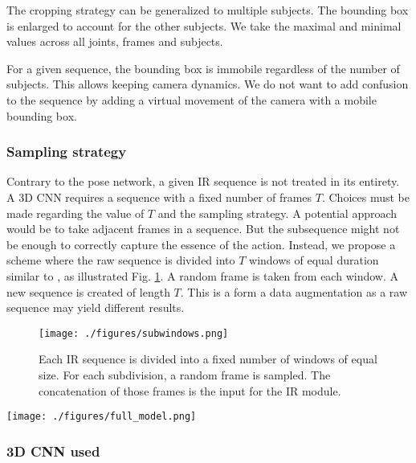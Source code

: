 \documentclass[letterpaper, 10 pt, conference]{ieeeconf}
\begin{document}
The cropping strategy can be generalized to multiple subjects. The bounding box is enlarged to account for the other subjects. We take the maximal and minimal values across all joints, frames and subjects.

For a given sequence, the bounding box is immobile regardless of the number of subjects. This allows keeping camera dynamics. We do not want to add confusion to the sequence by adding a virtual movement of the camera with a mobile bounding box. 

\subsubsection{Sampling strategy} \label{ir_sub_sample}

Contrary to the pose network, a given IR sequence is not treated in its entirety. A 3D CNN requires a sequence with a fixed number of frames $T$. Choices must be made regarding the value of $T$ and the sampling strategy. A potential approach would be to take adjacent frames in a sequence. But the subsequence might not be enough to correctly capture the essence of the action. Instead, we propose a scheme where the raw sequence is divided into $T$ windows of equal duration similar to \cite{liu2016spatio}, as illustrated Fig. \ref{sub_windows}. A random frame is taken from each window. A new sequence is created of length $T$. This is a form a data augmentation as a raw sequence may yield different results.

\begin{figure}[t]
  \centering
  \texttt{[image: ./figures/subwindows.png]}
  \caption{Each IR sequence is divided into a fixed number of windows of equal size. For each subdivision, a random frame is sampled. The concatenation of those frames is the input for the IR module.}
  \label{sub_windows}
\end{figure}

\begin{figure*}[t]
  \centering
  \texttt{[image: ./figures/full\_model.png]}
  \caption{The full detailed model. The pose and IR modules output separate feature vectors. The two are concatenated and a final MLP outputs a class probability distribution. The pose network is a pre-trained \textit{ResNet-18}. The IR network is a pre-trained \textit{R(2+1)D-18} network.}
  \label{full_model}
\end{figure*}

\subsubsection{3D CNN used}
\end{document}
